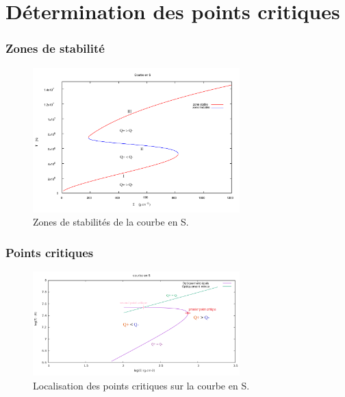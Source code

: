 \documentclass[french]{beamer}
\begin{document}
\section{Détermination des points critiques}
\begin{frame}
\frametitle{Zones de stabilité}

   \begin{figure}[htb!]
      \includegraphics[width=8cm]{figures/stable.pdf}
      \caption{Zones de stabilités de la courbe en S.}
    \end{figure}
\end{frame}

\begin{frame}		
\frametitle{Points critiques}		
		
   \begin{figure}[htb!]		
      \includegraphics[width=8cm]{figures/points_critiques.png}		
      \caption{Localisation des points critiques sur la courbe en S.}		
    \end{figure}		
\end{frame}		


\end{document}
